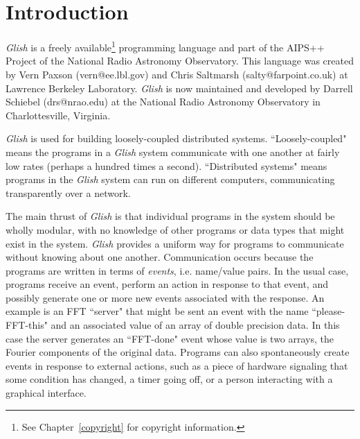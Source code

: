 
\chapter{Introduction}
{\em Glish} is a freely available\footnote{See Chapter~\ref{copyright} for copyright information.}
programming language and part of the 
AIPS++ Project of the National Radio Astronomy Observatory.  This
language was created by Vern Paxson (vern@ee.lbl.gov) and Chris
Saltmarsh (salty@farpoint.co.uk) at Lawrence Berkeley Laboratory.  
{\em Glish} is now maintained and developed by Darrell Schiebel
(drs@nrao.edu) at the National Radio Astronomy Observatory 
in Charlottesville, Virginia.  

{\em Glish} is used for building loosely-coupled distributed
systems.
``Loosely-coupled" means the programs in a {\em Glish}
system communicate with one another at fairly low rates (perhaps 
a hundred times a second).  ``Distributed systems" means 
programs in the {\em Glish} system can run on different computers,
communicating transparently over a network.

The main thrust of {\em Glish} is that individual programs in the
system should be wholly modular, with no knowledge of other programs or
data types that might exist in the system.  {\em Glish} provides a uniform way
for programs to communicate without knowing about one another.  Communication
occurs because the programs are written in terms of
{\em events\/},
i.e. name/value pairs.  In the usual case, programs receive an event, perform
an action in response to that event, and possibly generate one or
more new events associated with the response.  An example is an FFT
``server"
that might be sent an event with the name ``please-FFT-this"
and an associated value of an array of double precision data.  In this
case the
server generates an ``FFT-done" event whose value is two arrays,
the Fourier components of the original data.  Programs can
also spontaneously create events in response to external actions, such as a
piece of hardware signaling that some condition has changed, a timer going
off, or a person interacting with a graphical interface.

